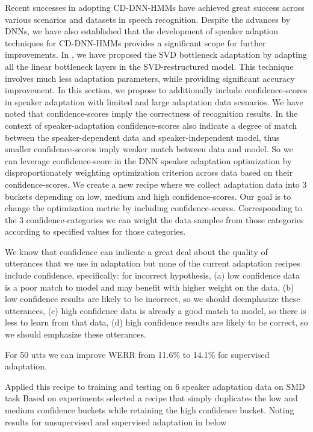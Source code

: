 Recent successes in adopting CD-DNN-HMMs have achieved great success across various scenarios and datasets in speech recognition. Despite the advances by DNNs, we have also established that the development of speaker adaption techniques for CD-DNN-HMMs provides a significant scope for further improvements. 
In \cite{xue-2014}, we have proposed the SVD bottleneck adaptation by adapting all the linear bottleneck layers in the SVD-restructured model. This technique involves much less adaptation parameters, while providing significant accuracy improvement.
In this section, we propose to additionally include confidence-scores in speaker adaptation with limited and large adaptation data scenarios. We have noted that confidence-scores imply the correctness of recognition results. In the context of speaker-adaptation confidence-scores also indicate a degree of match between the speaker-dependent data and speaker-independent model, thus smaller confidence-scores imply weaker match between data and model. So we can leverage confidence-score in the DNN speaker adaptation optimization by disproportionately weighting optimization criterion across data based on their confidence-scores. We create a new recipe where we collect adaptation data into 3 buckets depending on low, medium and high confidence-scores. Our goal is to change the optimization metric by including confidence-scores. Corresponding to the 3 confidence-categories we can weight the data samples from those categories according to specified values for those categories.

We know that confidence can indicate a great deal about the quality of utterances that we use in adaptation but none of the current adaptation recipes include confidence, specifically: for incorrect hypothesis, (a) low confidence data is a poor match to model and may benefit with higher weight on the data, (b) low confidence results are likely to be incorrect, so we should deemphasize these utterances, (c) high confidence data is already a good match to model, so there is less to learn from that data, (d) high confidence results are likely to be correct, so we should emphasize these utterances.

For 50 utts we can improve WERR from 11.6\% to 14.1\% for supervised adaptation.

Applied this recipe to training and testing on 6 speaker adaptation data on SMD task
Based on experiments selected a recipe that simply duplicates the low and medium confidence buckets while retaining the high confidence bucket. Noting results for unsupervised and supervised adaptation in below

